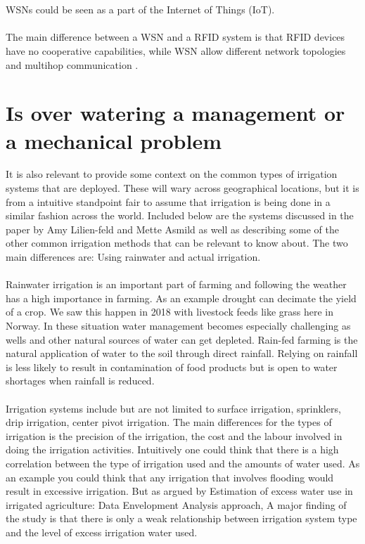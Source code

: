 \documentclass[]{uiophd}
\begin{document}
\\\\
WSNs could be seen as a part of the Internet of Things (IoT).
\\\\
The main difference between a WSN and a RFID system is that RFID devices have no cooperative capabilities, while WSN allow different network topologies and multihop communication \cite{3}.


\section{Is over watering a management or a mechanical problem}

It is also relevant to provide some context on the common types of irrigation systems that are deployed. These will wary across geographical locations, but it is from a intuitive standpoint fair to assume that irrigation is being done in a similar fashion across the world. Included below are the systems discussed in the paper by  Amy Lilien-feld and Mette Asmild as well as describing some of the  other common irrigation methods that can be relevant to know about. The two main differences are: Using rainwater and actual irrigation. 
\\\\
Rainwater irrigation is an important part of farming and following the weather has a high importance in farming. As an example drought can decimate the yield of a crop. We saw this happen in 2018 with livestock feeds like grass here in Norway. In these situation water management becomes especially challenging as wells and other natural sources of water can get depleted. Rain-fed farming is the natural application of water to the soil through direct rainfall. Relying on rainfall is less likely to result in contamination of food products but is open to water shortages when rainfall is reduced. \cite{cdc}
\\\\
Irrigation systems include but are not limited to surface irrigation, sprinklers, drip irrigation, center pivot irrigation. The main differences for the types of irrigation is the precision of the irrigation, the cost and the labour involved in doing the irrigation activities. Intuitively one could think that there is a high correlation between the type of irrigation used and the amounts of water used. As an example you could think that any irrigation that involves flooding would result in excessive irrigation. But as argued by Estimation of excess water use in irrigated agriculture: Data Envelopment Analysis approach, A major finding of the study is that there is only a weak relationship between irrigation system type and the level of excess irrigation water used. \cite{LILIENFELD200773}
\end{document}
